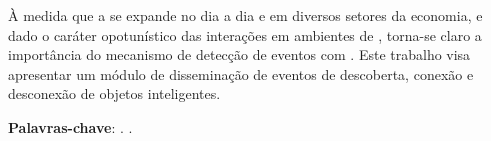 \setlength{\absparsep}{18pt} %
\begin{resumo}
    À medida que a \iot{} se expande no dia a dia e em diversos setores da economia, e dado o caráter opotunístico das interações em ambientes de \iomt{}, torna-se claro a importância do mecanismo de detecção de eventos com \smartobjs{}. Este trabalho visa apresentar um módulo de disseminação de eventos de descoberta, conexão e desconexão de objetos inteligentes.

	\textbf{Palavras-chave}: \iot{}. \Middleware{}.
\end{resumo}

